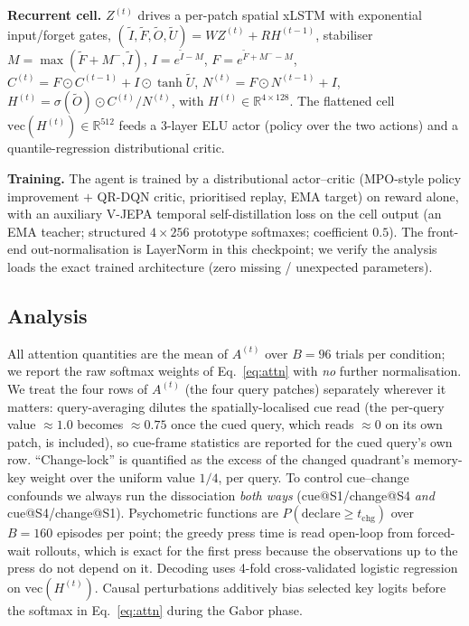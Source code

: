 \documentclass[11pt]{article}
\newcommand{\Rd}{\mathbb{R}}
\begin{document}
\textbf{Recurrent cell.} $Z^{(t)}$ drives a per-patch spatial xLSTM with exponential input/forget gates,
$(\,\tilde I,\tilde F,\tilde O,\tilde U) = W Z^{(t)} + R H^{(t-1)}$, stabiliser
$M=\max(\tilde F+M^{-},\tilde I)$, $I=e^{\tilde I-M}$, $F=e^{\tilde F+M^{-}-M}$,
$C^{(t)}=F\odot C^{(t-1)}+I\odot\tanh \tilde U$, $N^{(t)}=F\odot N^{(t-1)}+I$,
$H^{(t)}=\sigma(\tilde O)\odot C^{(t)}/N^{(t)}$, with $H^{(t)}\in\Rd^{4\times128}$. The flattened cell
$\mathrm{vec}(H^{(t)})\in\Rd^{512}$ feeds a 3-layer ELU actor (policy over the two actions) and a
quantile-regression distributional critic.

\textbf{Training.} The agent is trained by a distributional actor--critic (MPO-style policy improvement
$+$ QR-DQN critic, prioritised replay, EMA target) on reward alone, with an auxiliary V-JEPA temporal
self-distillation loss on the cell output (an EMA teacher; structured $4\times256$ prototype softmaxes;
coefficient $0.5$). The front-end out-normalisation is LayerNorm in this checkpoint; we verify the
analysis loads the exact trained architecture (zero missing / unexpected parameters).

\subsection{Analysis}
All attention quantities are the mean of $A^{(t)}$ over $B{=}96$ trials per condition; we report the raw
softmax weights of Eq.~\eqref{eq:attn} with \emph{no} further normalisation. We treat the four rows of
$A^{(t)}$ (the four query patches) separately wherever it matters: query-averaging dilutes the
spatially-localised cue read (the per-query value $\approx\!1.0$ becomes $\approx\!0.75$ once the cued
query, which reads $\approx\!0$ on its own patch, is included), so cue-frame statistics are reported for the cued
query's own row. ``Change-lock'' is quantified as the excess of the changed quadrant's memory-key weight
over the uniform value $1/4$, per query. To control cue--change confounds we always run the dissociation
\emph{both ways} (cue@S1/change@S4 \emph{and} cue@S4/change@S1). Psychometric functions are
$P(\text{declare}\ge t_{\text{chg}})$ over $B{=}160$ episodes per point; the greedy press time is read
open-loop from forced-wait rollouts, which is exact for the first press because the observations up to
the press do not depend on it. Decoding uses
4-fold cross-validated logistic regression on $\mathrm{vec}(H^{(t)})$. Causal perturbations additively
bias selected key logits before the softmax in Eq.~\eqref{eq:attn} during the Gabor phase.
\end{document}
